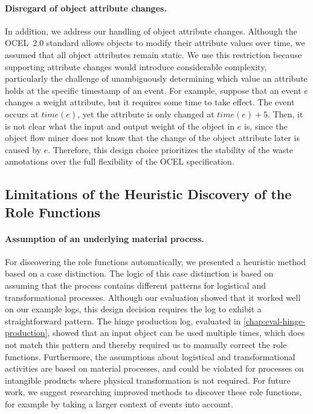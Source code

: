 \paragraph{Disregard of object attribute changes.}
In addition, we address our handling of object attribute changes.
Although the OCEL~2.0 standard allows objects to modify their attribute values over time, we assumed that all object attributes remain static.
We use this restriction because supporting attribute changes would introduce considerable complexity, particularly the challenge of unambiguously determining which value an attribute holds at the specific timestamp of an event.
For example, suppose that an event $e$ changes a weight attribute, but it requires some time to take effect.
The event occurs at $time(e)$, yet the attribute is only changed at $time(e) + 5$.
Then, it is not clear what the input and output weight of the object in $e$ is, since the object flow miner does not know that the change of the object attribute later is caused by $e$.
Therefore, this design choice prioritizes the stability of the waste annotations over the full flexibility of the OCEL specification.




\subsection{Limitations of the Heuristic Discovery of the Role Functions}



\paragraph{Assumption of an underlying material process.}
For discovering the role functions automatically, we presented a heuristic method based on a case distinction.
The logic of this case distinction is based on assuming that the process contains different patterns for logistical and transformational processes.
Although our evaluation showed that it worked well on our example logs, this design decision requires the log to exhibit a straightforward pattern.
The hinge production log, evaluated in \cref{chap:eval-hinge-production}, showed that an input object can be used multiple times, which does not match this pattern and thereby required us to manually correct the role functions.
Furthermore, the assumptions about logistical and transformational activities are based on material processes, and could be violated for processes on intangible products where physical transformation is not required.
For future work, we suggest researching improved methods to discover these role functions, for example by taking a larger context of events into account.



